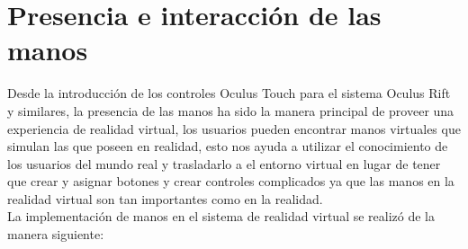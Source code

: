 \section{Presencia e interacción de las manos}
Desde la introducción de los controles Oculus Touch para el sistema Oculus Rift y similares, la presencia de las manos ha sido la manera principal de proveer una experiencia de 
realidad virtual, los usuarios pueden encontrar manos virtuales que simulan las que poseen en realidad, esto nos ayuda a utilizar el conocimiento de los usuarios del mundo real y 
trasladarlo a el entorno virtual en lugar de tener que crear y asignar botones y crear controles complicados ya que las manos en la realidad virtual son tan importantes como en 
la realidad.\\
La implementación de manos en el sistema de realidad virtual se realizó de la manera siguiente:\\

